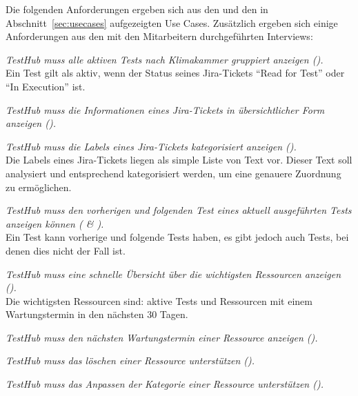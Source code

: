 Die folgenden Anforderungen ergeben sich aus den  und den
in Abschnitt~\ref{sec:usecases} aufgezeigten Use Cases. Zusätzlich ergeben sich einige 
Anforderungen aus den mit den Mitarbeitern durchgeführten Interviews:

\begin{description}


    \textit{TestHub muss alle aktiven Tests nach Klimakammer gruppiert anzeigen ().}\\
    Ein Test gilt als aktiv, wenn der Status seines Jira-Tickets ``Read for Test''
    oder ``In Execution'' ist.

    \textit{TestHub muss die Informationen eines Jira-Tickets in übersichtlicher 
    Form anzeigen ().}

    \textit{TestHub muss die Labels eines Jira-Tickets kategorisiert anzeigen ().}\\
    Die Labels eines Jira-Tickets liegen als simple Liste von Text vor. Dieser 
    Text soll analysiert und entsprechend kategorisiert werden, um eine genauere 
    Zuordnung zu ermöglichen.

    \textit{TestHub muss den vorherigen und folgenden Test eines aktuell 
    ausgeführten Tests anzeigen können ( \& ).}\\
    Ein Test kann vorherige und folgende Tests haben, es gibt jedoch auch Tests,
    bei denen dies nicht der Fall ist.    

    \textit{TestHub muss eine schnelle Übersicht über die wichtigsten Ressourcen anzeigen ().}\\
    Die wichtigsten Ressourcen sind: aktive Tests und Ressourcen mit einem Wartungstermin
    in den nächsten 30 Tagen.

    \textit{TestHub muss den nächsten Wartungstermin einer Ressource anzeigen ().}
    
    \textit{TestHub muss das löschen einer Ressource unterstützen ().}
       
    \textit{TestHub muss das Anpassen der Kategorie einer Ressource unterstützen 
    ().}


\end{description}
